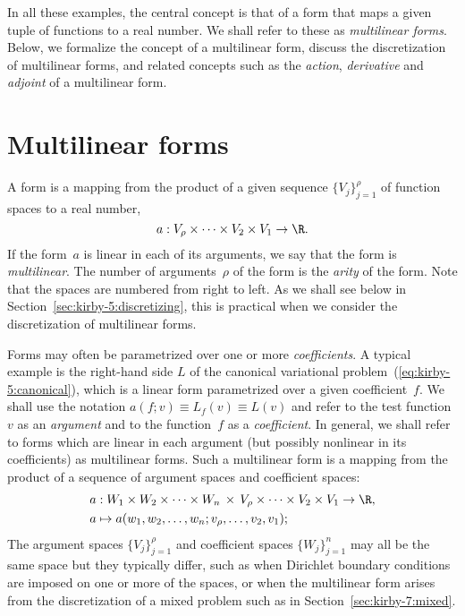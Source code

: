 In all these examples, the central concept is that of a form that maps
a given tuple of functions to a real number. We shall refer to these
as \emph{multilinear forms}. Below, we formalize the concept of a
multilinear form, discuss the discretization of multilinear forms, and
related concepts such as the \emph{action}, \emph{derivative} and
\emph{adjoint} of a multilinear form.

\section{Multilinear forms}

A form is a mapping from the product of a given sequence
$\{V_j\}_{j=1}^{\rho}$ of function spaces to a real number,
\begin{equation}
  a : V_{\rho} \times \cdots \times V_2 \times V_1 \rightarrow \R.
\end{equation}
If the form~$a$ is linear in each of its arguments, we say that the
form is \emph{multilinear}. The number of arguments~$\rho$ of the form
is the \emph{arity} of the form. Note that the spaces are numbered
from right to left. As we shall see below in
Section~\ref{sec:kirby-5:discretizing}, this is practical when we
consider the discretization of multilinear forms.

Forms may often be parametrized over one or more
\emph{coefficients}. A typical example is the right-hand side $L$ of
the canonical variational problem~(\ref{eq:kirby-5:canonical}), which
is a linear form parametrized over a given coefficient~$f$. We shall
use the notation $a(f; v) \equiv L_f(v) \equiv L(v)$ and refer to the
test function~$v$ as an \emph{argument} and to the function~$f$ as a
\emph{coefficient}. In general, we shall refer to forms which are
linear in each argument (but possibly nonlinear in its coefficients)
as multilinear forms. Such a multilinear form is a mapping from the
product of a sequence of argument spaces and coefficient spaces:
\begin{equation}
  \begin{split}
    a &: W_1 \times W_2 \times \cdots \times W_n \, \times \,
         V_{\rho} \times \cdots \times V_2 \times V_1 \rightarrow \R, \\
    a &\mapsto a(w_1, w_2, \ldots, w_n; v_{\rho}, \ldots, v_2, v_1);
  \end{split}
\end{equation}
The argument spaces $\{V_j\}_{j=1}^{\rho}$ and coefficient spaces
$\{W_j\}_{j=1}^n$ may all be the same space but they typically differ,
such as when Dirichlet boundary conditions are imposed on one or more of
the spaces, or when the multilinear form arises from the discretization
of a mixed problem such as in Section~\ref{sec:kirby-7:mixed}.

